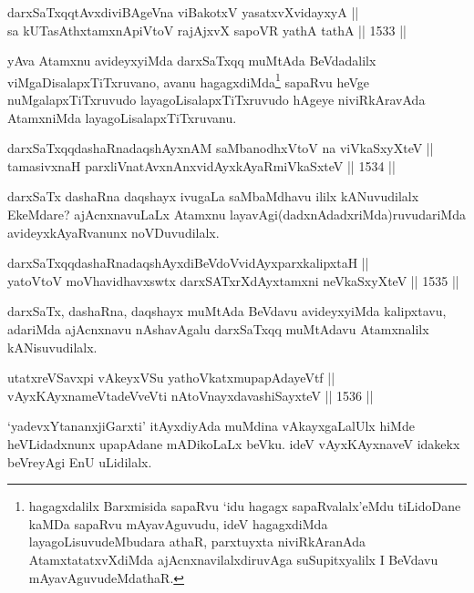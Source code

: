 \begin{shl}
darxSaTxqqtAvxdiviBAgeVna viBakotxV yasatxvXvidayxyA ||  \\
sa kUTasAthxtamxnA\s piVtoV rajAjxvX sapoVR yathA tathA ||  1533 ||  
\end{shl}

\begin{artha}
yAva Atamxnu avideyxyiMda darxSaTxqq muMtAda BeVdadalilx viMgaDisalapxTiTxruvano, avanu hagagxdiMda\footnote{hagagxdalilx Barxmisida sapaRvu `idu hagagx sapaRvalalx'eMdu tiLidoDane kaMDa sapaRvu mAyavAguvudu, ideV hagagxdiMda layagoLisuvudeMbudara athaR, parxtuyxta niviRkAranAda AtamxtatatxvXdiMda ajAcnxnavilalxdiruvAga suSupitxyalilx I BeVdavu mAyavAguvudeMdathaR.} sapaRvu heVge nuMgalapxTiTxruvudo layagoLisalapxTiTxruvudo hAgeye niviRkAravAda AtamxniMda layagoLisalapxTiTxruvanu.
\end{artha}

\begin{shl}
darxSaTxqqdashaRnadaqshAyxnAM saMbanodhxV\s toV na viVkaSxyXteV || \\
tamasivxnaH parxliVnatAvxnAnxvidAyxkAyaRmiVkaSxteV ||  1534 ||  
\end{shl}

\begin{artha}
darxSaTx dashaRna daqshayx ivugaLa saMbaMdhavu ililx kANuvudilalx EkeMdare? ajAcnxnavuLaLx Atamxnu layavAgi(dadxnAdadxriMda)ruvudariMda avideyxkAyaRvanunx noVDuvudilalx.
\end{artha}

\begin{shl}
darxSaTxqqdashaRnadaqshAyxdiBeVdoV\s vidAyxparxkalipxtaH || \\
yatoV\s toV moVhavidhavxswtx darxSATxrXdAyxtamxni neVkaSxyXteV ||  1535 ||  
\end{shl}

\begin{artha}
darxSaTx, dashaRna, daqshayx muMtAda BeVdavu avideyxyiMda kalipxtavu, adariMda ajAcnxnavu nAshavAgalu darxSaTxqq muMtAdavu Atamxnalilx kANisuvudilalx.
\end{artha}

\begin{shl}
utatxreVSavxpi vAkeyxVSu yathoVkatxmupapAdayeVtf ||  \\
vAyxKAyxnameVtadeVveVti nAtoV\s nayxdavashiSayxteV ||  1536 ||  
\end{shl}

\begin{artha}
`yadevxYtananxjiGarxti' itAyxdiyAda muMdina vAkayxgaLalUlx hiMde heVLidadxnunx upapAdane mADikoLaLx beVku. ideV vAyxKAyxnaveV idakekx beVreyAgi EnU uLidilalx.
\end{artha}

